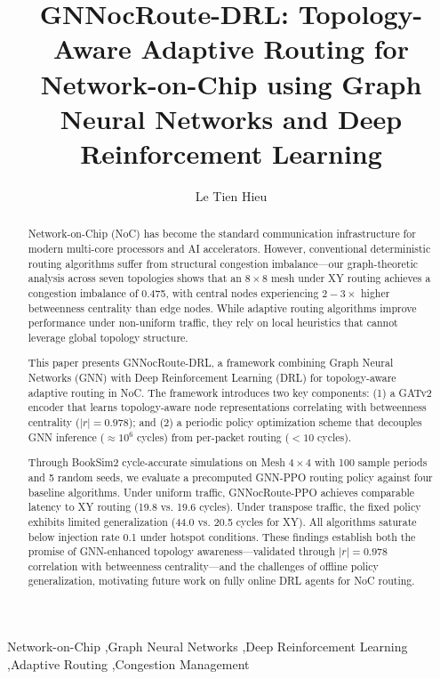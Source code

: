 \documentclass[5p,twocolumn]{elsarticle}
\begin{document}
\begin{frontmatter}

\title{GNNocRoute-DRL: Topology-Aware Adaptive Routing for Network-on-Chip using Graph Neural Networks and Deep Reinforcement Learning}

\author[1]{Le Tien Hieu}

\address[1]{Institute of Information Technology, Vietnam National University, Hanoi, Vietnam}

\begin{abstract}
Network-on-Chip (NoC) has become the standard communication infrastructure for modern multi-core processors and AI accelerators. However, conventional deterministic routing algorithms suffer from structural congestion imbalance---our graph-theoretic analysis across seven topologies shows that an $8\times8$ mesh under XY routing achieves a congestion imbalance of 0.475, with central nodes experiencing $2-3\times$ higher betweenness centrality than edge nodes. While adaptive routing algorithms improve performance under non-uniform traffic, they rely on local heuristics that cannot leverage global topology structure.

This paper presents GNNocRoute-DRL, a framework combining Graph Neural Networks (GNN) with Deep Reinforcement Learning (DRL) for topology-aware adaptive routing in NoC. The framework introduces two key components: (1) a GATv2 encoder that learns topology-aware node representations correlating with betweenness centrality ($|r| = 0.978$); and (2) a periodic policy optimization scheme that decouples GNN inference ($\approx 10^6$ cycles) from per-packet routing ($<10$ cycles).

Through BookSim2 cycle-accurate simulations on Mesh $4\times4$ with 100 sample periods and 5 random seeds, we evaluate a precomputed GNN-PPO routing policy against four baseline algorithms. Under uniform traffic, GNNocRoute-PPO achieves comparable latency to XY routing (19.8 vs. 19.6 cycles). Under transpose traffic, the fixed policy exhibits limited generalization (44.0 vs. 20.5 cycles for XY). All algorithms saturate below injection rate 0.1 under hotspot conditions. These findings establish both the promise of GNN-enhanced topology awareness---validated through $|r| = 0.978$ correlation with betweenness centrality---and the challenges of offline policy generalization, motivating future work on fully online DRL agents for NoC routing.
\end{abstract}

\begin{keyword}
Network-on-Chip \sep Graph Neural Networks \sep Deep Reinforcement Learning \sep Adaptive Routing \sep Congestion Management
\end{keyword}

\end{frontmatter}










\nocite{*}


\end{document}
